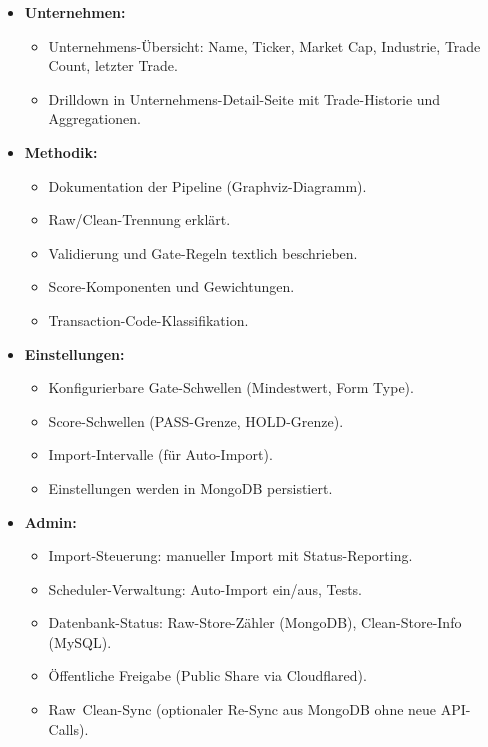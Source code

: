 \begin{itemize}
\begin{itemize}
\begin{itemize}
          \item In Advanced Mode: zusätzliche Spalten (CIK, Market Cap, Industry, Validation Status).
        \end{itemize}
      \item Drilldown: Klick auf Trade öffnet Detailansicht. %
    \end{itemize}
  \item \textbf{Unternehmen:} %
    \begin{itemize}
      \item Unternehmens-Übersicht: Name, Ticker, Market Cap, Industrie, Trade Count, letzter Trade. %
      \item Drilldown in Unternehmens-Detail-Seite mit Trade-Historie und Aggregationen. %
    \end{itemize}
  \item \textbf{Methodik:} %
    \begin{itemize}
      \item Dokumentation der Pipeline (Graphviz-Diagramm). %
      \item Raw/Clean-Trennung erklärt.
      \item Validierung und Gate-Regeln textlich beschrieben.
      \item Score-Komponenten und Gewichtungen. %
      \item Transaction-Code-Klassifikation.
    \end{itemize}
  \item \textbf{Einstellungen:} %
    \begin{itemize}
      \item Konfigurierbare Gate-Schwellen (Mindestwert, Form Type).
      \item Score-Schwellen (PASS-Grenze, HOLD-Grenze).
      \item Import-Intervalle (für Auto-Import).
      \item Einstellungen werden in MongoDB persistiert. %
    \end{itemize}
  \item \textbf{Admin:} %
    \begin{itemize}
      \item Import-Steuerung: manueller Import mit Status-Reporting. %
      \item Scheduler-Verwaltung: Auto-Import ein/aus, Tests.
      \item Datenbank-Status: Raw-Store-Zähler (MongoDB), Clean-Store-Info (MySQL).
      \item Öffentliche Freigabe (Public Share via Cloudflared).
      \item Raw~Clean-Sync (optionaler Re-Sync aus MongoDB ohne neue API-Calls).
    \end{itemize}
\end{itemize}

